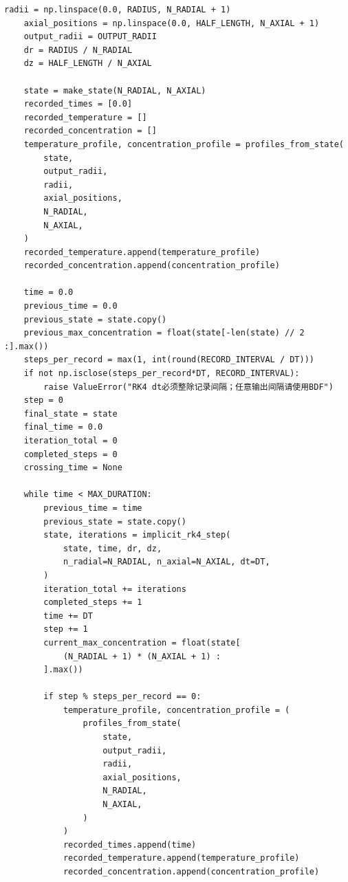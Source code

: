 \documentclass[12pt,a4paper]{ctexart}
\begin{document}
\begin{lstlisting}[caption={solve\_problem3.py }]
    radii = np.linspace(0.0, RADIUS, N_RADIAL + 1)
    axial_positions = np.linspace(0.0, HALF_LENGTH, N_AXIAL + 1)
    output_radii = OUTPUT_RADII
    dr = RADIUS / N_RADIAL
    dz = HALF_LENGTH / N_AXIAL

    state = make_state(N_RADIAL, N_AXIAL)
    recorded_times = [0.0]
    recorded_temperature = []
    recorded_concentration = []
    temperature_profile, concentration_profile = profiles_from_state(
        state,
        output_radii,
        radii,
        axial_positions,
        N_RADIAL,
        N_AXIAL,
    )
    recorded_temperature.append(temperature_profile)
    recorded_concentration.append(concentration_profile)

    time = 0.0
    previous_time = 0.0
    previous_state = state.copy()
    previous_max_concentration = float(state[-len(state) // 2 :].max())
    steps_per_record = max(1, int(round(RECORD_INTERVAL / DT)))
    if not np.isclose(steps_per_record*DT, RECORD_INTERVAL):
        raise ValueError("RK4 dt必须整除记录间隔；任意输出间隔请使用BDF")
    step = 0
    final_state = state
    final_time = 0.0
    iteration_total = 0
    completed_steps = 0
    crossing_time = None

    while time < MAX_DURATION:
        previous_time = time
        previous_state = state.copy()
        state, iterations = implicit_rk4_step(
            state, time, dr, dz,
            n_radial=N_RADIAL, n_axial=N_AXIAL, dt=DT,
        )
        iteration_total += iterations
        completed_steps += 1
        time += DT
        step += 1
        current_max_concentration = float(state[
            (N_RADIAL + 1) * (N_AXIAL + 1) :
        ].max())

        if step % steps_per_record == 0:
            temperature_profile, concentration_profile = (
                profiles_from_state(
                    state,
                    output_radii,
                    radii,
                    axial_positions,
                    N_RADIAL,
                    N_AXIAL,
                )
            )
            recorded_times.append(time)
            recorded_temperature.append(temperature_profile)
            recorded_concentration.append(concentration_profile)


\end{lstlisting}
\end{document}
